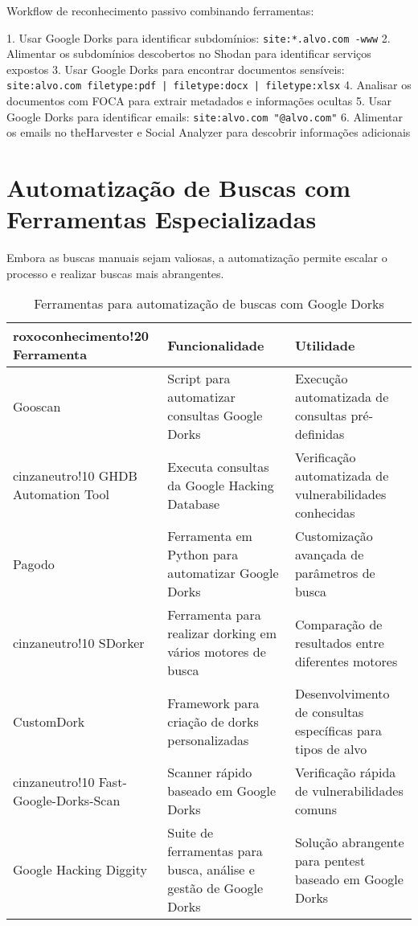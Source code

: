 \documentclass[12pt,a4paper]{book}
\begin{document}
\begin{examplebox}
Workflow de reconhecimento passivo combinando ferramentas:

1. Usar Google Dorks para identificar subdomínios: \texttt{site:*.alvo.com -www}
2. Alimentar os subdomínios descobertos no Shodan para identificar serviços expostos
3. Usar Google Dorks para encontrar documentos sensíveis: \texttt{site:alvo.com filetype:pdf | filetype:docx | filetype:xlsx}
4. Analisar os documentos com FOCA para extrair metadados e informações ocultas
5. Usar Google Dorks para identificar emails: \texttt{site:alvo.com "@alvo.com"}
6. Alimentar os emails no theHarvester e Social Analyzer para descobrir informações adicionais
\end{examplebox}

\section{Automatização de Buscas com Ferramentas Especializadas}

Embora as buscas manuais sejam valiosas, a automatização permite escalar o processo e realizar buscas mais abrangentes.

\begin{table}[h]
\centering
\begin{tabular}{|p{3cm}|p{5cm}|p{7cm}|}
\hline
{roxoconhecimento!20} \textbf{Ferramenta} & \textbf{Funcionalidade} & \textbf{Utilidade} \\
\hline
Gooscan & Script para automatizar consultas Google Dorks & Execução automatizada de consultas pré-definidas \\
\hline
{cinzaneutro!10} GHDB Automation Tool & Executa consultas da Google Hacking Database & Verificação automatizada de vulnerabilidades conhecidas \\
\hline
Pagodo & Ferramenta em Python para automatizar Google Dorks & Customização avançada de parâmetros de busca \\
\hline
{cinzaneutro!10} SDorker & Ferramenta para realizar dorking em vários motores de busca & Comparação de resultados entre diferentes motores \\
\hline
CustomDork & Framework para criação de dorks personalizadas & Desenvolvimento de consultas específicas para tipos de alvo \\
\hline
{cinzaneutro!10} Fast-Google-Dorks-Scan & Scanner rápido baseado em Google Dorks & Verificação rápida de vulnerabilidades comuns \\
\hline
Google Hacking Diggity & Suite de ferramentas para busca, análise e gestão de Google Dorks & Solução abrangente para pentest baseado em Google Dorks \\
\hline
\end{tabular}
\caption{Ferramentas para automatização de buscas com Google Dorks}
\end{table}
\end{document}
